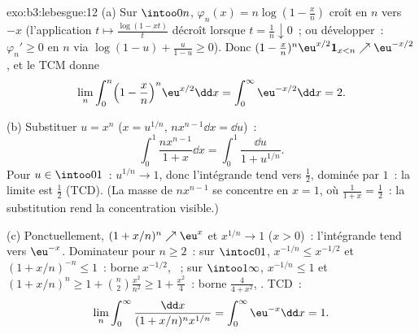 \begin{solution}{exo:b3:lebesgue:12}
(a) Sur $\intoo0n$, $\varphi_n(x) = n\log(1 - \frac xn)$
croît en $n$ vers $-x$ (l'application $t \mapsto
\frac{\log(1 - xt)}{t}$ décroît lorsque $t = \frac1n
\downarrow 0$~; ou développer~: $\varphi_{n}' \geq 0$ en
$n$ via $\log(1-u) + \frac{u}{1-u} \geq 0$). Donc $(1 -
\frac xn)^n\eu^{x/2}\mathbf 1_{x<n} \nearrow
\eu^{-x/2}$, et le TCM donne
\[
\lim_n\int_0^n\Bigl(1 - \frac xn\Bigr)^n\eu^{x/2}\dd x =
\int_0^\infty\eu^{-x/2}\dd x = 2 .
\]

(b) Substituer $u = x^n$ ($x = u^{1/n}$, $n x^{n-1}\dd x =
\dd u$)~:
\[
\int_0^1\frac{nx^{n-1}}{1 + x}\dd x =
\int_0^1\frac{\dd u}{1 + u^{1/n}} .
\]
Pour $u \in \intoo01$~: $u^{1/n} \to 1$, donc l'intégrande
tend vers $\frac12$, dominée par $1$~: la limite est
$\frac12$ (TCD). (La masse de $nx^{n-1}$ se concentre en
$x = 1$, où $\frac1{1+x} = \frac12$~: la substitution
rend la concentration visible.)

(c) Ponctuellement, $(1 + x/n)^n \nearrow \eu^x$ et
$x^{1/n} \to 1$ ($x > 0$)~: l'intégrande tend vers
$\eu^{-x}$. Dominateur pour $n \geq 2$~: sur $\intoc01$,
$x^{-1/n} \leq x^{-1/2}$ et $(1 + x/n)^{-n} \leq 1$~: borne
$x^{-1/2}$, ~; sur $\intoo1\infty$, $x^{-1/n}
\leq 1$ et $(1 + x/n)^n \geq 1 +
\binom n2\frac{x^2}{n^2} \geq 1 + \frac{x^2}4$~: borne
$\frac{4}{4 + x^2}$, . TCD~:
\[
\lim_n\int_0^\infty\frac{\dd x}{(1 + x/n)^nx^{1/n}} =
\int_0^\infty\eu^{-x}\dd x = 1 .
\]
\end{solution}

